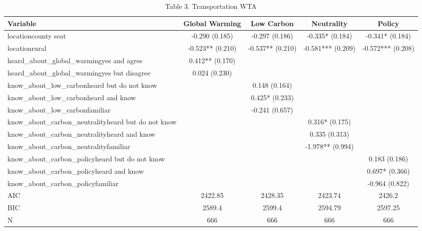 \begin{table}[!htbp]
\centering
\caption{Table 3. Transportation WTA}
\begin{tabular}{lcccc}
\hline
Variable & Global Warming & Low Carbon & Neutrality & Policy \\
\hline
locationcounty seat & -0.290 (0.185) & -0.297 (0.186) & -0.335* (0.184) & -0.341* (0.184) \\
locationrural & -0.523** (0.210) & -0.537** (0.210) & -0.581*** (0.209) & -0.572*** (0.208) \\
heard\_about\_global\_warmingyes and agree & 0.412** (0.170) &  &  &  \\
heard\_about\_global\_warmingyes but disagree & 0.024 (0.230) &  &  &  \\
know\_about\_low\_carbonheard but do not know &  & 0.148 (0.164) &  &  \\
know\_about\_low\_carbonheard and know &  & 0.425* (0.233) &  &  \\
know\_about\_low\_carbonfamiliar &  & -0.241 (0.657) &  &  \\
know\_about\_carbon\_neutralityheard but do not know &  &  & 0.316* (0.175) &  \\
know\_about\_carbon\_neutralityheard and know &  &  & 0.335 (0.313) &  \\
know\_about\_carbon\_neutralityfamiliar &  &  & -1.978** (0.994) &  \\
know\_about\_carbon\_policyheard but do not know &  &  &  & 0.183 (0.186) \\
know\_about\_carbon\_policyheard and know &  &  &  & 0.697* (0.366) \\
know\_about\_carbon\_policyfamiliar &  &  &  & -0.964 (0.822) \\
AIC & 2422.85 & 2428.35 & 2423.74 & 2426.2 \\
BIC & 2589.4 & 2599.4 & 2594.79 & 2597.25 \\
N & 666 & 666 & 666 & 666 \\
\hline
\end{tabular}
\end{table}
